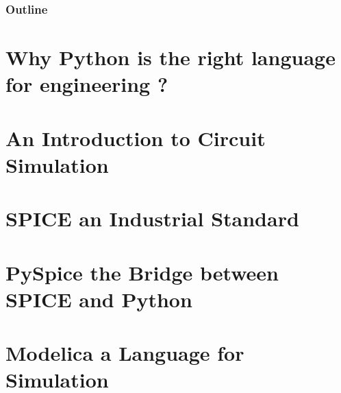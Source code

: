 
\begin{frame}
  \frametitle{Outline}
  \tableofcontents
\end{frame}

%
%

% 

\section{Why Python is the right language for engineering ?}


\section{An Introduction to Circuit Simulation}


\section{SPICE an Industrial Standard}



\section{PySpice the Bridge between SPICE and Python}



\section{Modelica a Language for Simulation}




